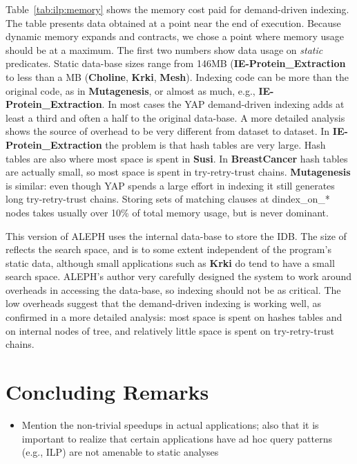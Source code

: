 \documentclass{llncs}
\newcommand{\instr}[1]{\textsf{#1}}
\newcommand{\TryRetryTrust}{\mbox{\instr{try-retry-trust}}\xspace}
\newcommand{\jitiSTAR}{\mbox{\instr{dindex\_on\_*}}\xspace}
\newcommand{\JITI}{demand-driven indexing\xspace}
\newcommand{\bench}[1]{\textbf{\textsf{#1}}}
\newcommand{\BreastCancer}{\bench{BreastCancer}\xspace}
\begin{document}
Table~\ref{tab:ilp:memory} shows the memory cost paid for \JITI. The
table presents data obtained at a point near the end of execution.
Because dynamic memory expands and contracts, we chose a point where
memory usage should be at a maximum. The first two numbers show data
usage on \emph{static} predicates. Static data-base sizes range from
146MB (\bench{IE-Protein\_Extraction} to less than a MB
(\bench{Choline}, \bench{Krki}, \bench{Mesh}). Indexing code can be
more than the original code, as in \bench{Mutagenesis}, or almost as
much, e.g., \bench{IE-Protein\_Extraction}. In most cases the YAP \JITI
adds at least a third and often a half to the original data-base. A
more detailed analysis shows the source of overhead to be very
different from dataset to dataset. In \bench{IE-Protein\_Extraction}
the problem is that hash tables are very large. Hash tables are also
where most space is spent in \bench{Susi}. In \BreastCancer
hash tables are actually small, so most space is spent in
\TryRetryTrust chains. \bench{Mutagenesis} is similar: even though YAP
spends a large effort in indexing it still generates long
\TryRetryTrust chains. Storing sets of matching clauses at \jitiSTAR
nodes takes usually over 10\% of total memory usage, but is never
dominant.

This version of ALEPH uses the internal data-base to store the IDB.
The size of reflects the search space, and is to some extent
independent of the program's static data, although small applications
such as \bench{Krki} do tend to have a small search space. ALEPH's
author very carefully designed the system to work around overheads in
accessing the data-base, so indexing should not be as critical. The
low overheads suggest that the \JITI is working well, as confirmed in
a more detailed analysis: most space is spent on hashes tables and on
internal nodes of tree, and relatively little space is spent on
\TryRetryTrust chains.



\section{Concluding Remarks}
\begin{itemize}
\item Mention the non-trivial speedups in actual applications; also
  that it is important to realize that certain applications have ad
  hoc query patterns (e.g., ILP) are not amenable to static analyses
\end{itemize}



\end{document}
